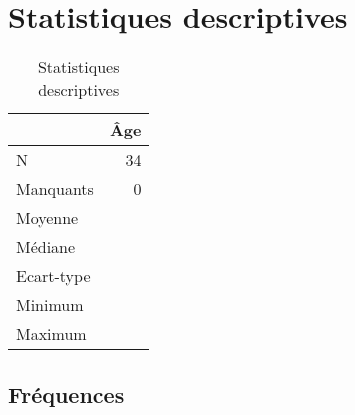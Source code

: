 \documentclass[a4paper,man,hidelinks,floatsintext,x11names]{apa7}
\begin{document}
      
        
      
    
      
      
    
      
        
      
    
      
      
    
            
\section{Statistiques descriptives}

           
      
        
      
    
\begin{table}[!htbp]
\caption{Statistiques descriptives}
\label{tab:Table_3}
\begin{adjustbox}{max size={\columnwidth}{\textheight}}
\centering
\begin{tabular}{lr}
\toprule
~          & Âge \\
\midrule
N          &  34 \\
Manquants  &   0 \\
Moyenne    &   ~ \\
Médiane    &   ~ \\
Ecart-type &   ~ \\
Minimum    &   ~ \\
Maximum    &   ~ \\
\bottomrule
\end{tabular}
\end{adjustbox}
\begin{tablenotes} {
\small
}
\end{tablenotes}
\end{table}


      
        
      
    
\subsection{Fréquences}

      
        
      
    
\end{document}
